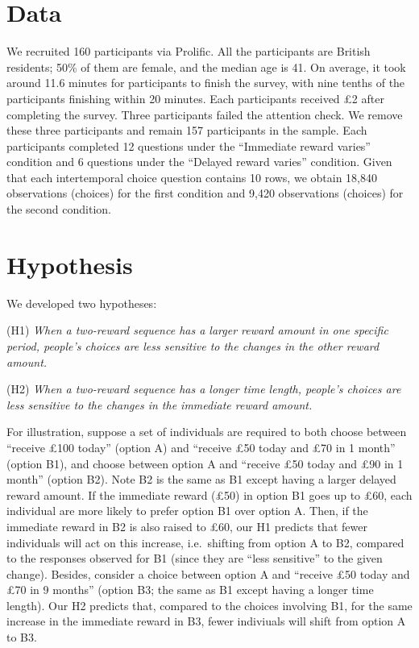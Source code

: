 \documentclass[
  12pt,
]{article}
\begin{document}
\hypertarget{data}{%
\section{Data}\label{data}}

We recruited 160 participants via Prolific. All the participants are
British residents; 50\% of them are female, and the median age is 41. On
average, it took around 11.6 minutes for participants to finish the
survey, with nine tenths of the participants finishing within 20
minutes. Each participants received £2 after completing the survey.
Three participants failed the attention check. We remove these three
participants and remain 157 participants in the sample. Each
participants completed 12 questions under the ``Immediate reward
varies'' condition and 6 questions under the ``Delayed reward varies''
condition. Given that each intertemporal choice question contains 10
rows, we obtain 18,840 observations (choices) for the first condition
and 9,420 observations (choices) for the second condition.

\hypertarget{hypothesis}{%
\section{Hypothesis}\label{hypothesis}}

We developed two hypotheses:

\setlength{\leftskip}{24pt}

(H1) \emph{When a two-reward sequence has a larger reward amount in one
specific period, people's choices are less sensitive to the changes in
the other reward amount.}

(H2) \emph{When a two-reward sequence has a longer time length, people's
choices are less sensitive to the changes in the immediate reward
amount.}

\setlength{\leftskip}{0pt}

For illustration, suppose a set of individuals are required to both
choose between ``receive £100 today'' (option A) and ``receive £50 today
and £70 in 1 month'' (option B1), and choose between option A and
``receive £50 today and £90 in 1 month'' (option B2). Note B2 is the
same as B1 except having a larger delayed reward amount. If the
immediate reward (£50) in option B1 goes up to £60, each individual are
more likely to prefer option B1 over option A. Then, if the immediate
reward in B2 is also raised to £60, our H1 predicts that fewer
individuals will act on this increase, i.e.~shifting from option A to
B2, compared to the responses observed for B1 (since they are ``less
sensitive'' to the given change). Besides, consider a choice between
option A and ``receive £50 today and £70 in 9 months'' (option B3; the
same as B1 except having a longer time length). Our H2 predicts that,
compared to the choices involving B1, for the same increase in the
immediate reward in B3, fewer indiviuals will shift from option A to B3.
\end{document}
